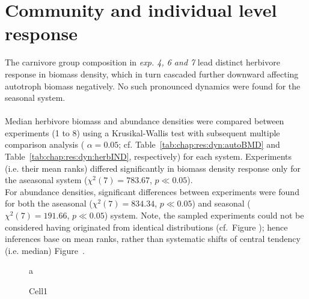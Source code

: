 \section{Community and individual level response}
\label{chap:res:popind}
%
The carnivore group composition in \textit{exp. 4, 6 and 7} lead distinct herbivore response in biomass density, which in turn cascaded further downward affecting autotroph biomass negatively. No such pronounced dynamics were found for the seasonal system.\\\\
Median herbivore biomass and abundance densities were compared between experiments (1 to 8) using a Krusikal-Wallis test with subsequent multiple comparison analysis ( $\alpha = 0.05$; cf. Table~\ref{tab:chap:res:dyn:autoBMD} and Table~\ref{tab:chap:res:dyn:herbIND}, respectively) for each system. 
Experiments (i.e. their mean ranks) differed significantly in biomass density response only for the aseasonal  system ($\chi^{2}(7) = 783.67$, $p \ll 0.05$). 
\\
For abundance densities, significant differences between experiments were found for both the aseasonal ($\chi^{2}(7) = 834.34$, $p \ll 0.05$) and seasonal ($\chi^{2}(7) = 191.66$, $p \ll 0.05$) system. 
Note, the sampled experiments could not be considered having originated from identical distributions (cf.~Figure ); 
hence inferences base on mean ranks, rather than systematic shifts of central tendency (i.e. median) Figure~.

\begin{figure}
\centering

\caption[Average body mass (aseasonal system)]{a}
\label{fig:chap:res:dyn:c0}
\end{figure}




%

\begin{figure}
\centering

\caption{Cell1}
\label{fig:chap:res:dyn:cell1}
\end{figure}




